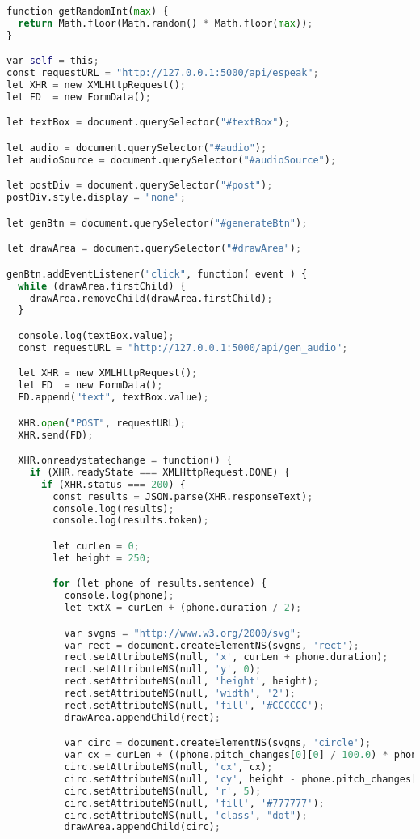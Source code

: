\begin{lstlisting}[caption=Script para editor gráfico, label=editorjs, language=Python]
function getRandomInt(max) {
  return Math.floor(Math.random() * Math.floor(max));
}

var self = this;
const requestURL = "http://127.0.0.1:5000/api/espeak";
let XHR = new XMLHttpRequest();
let FD  = new FormData();

let textBox = document.querySelector("#textBox");

let audio = document.querySelector("#audio");
let audioSource = document.querySelector("#audioSource");

let postDiv = document.querySelector("#post");
postDiv.style.display = "none";

let genBtn = document.querySelector("#generateBtn");

let drawArea = document.querySelector("#drawArea");

genBtn.addEventListener("click", function( event ) {
  while (drawArea.firstChild) {
    drawArea.removeChild(drawArea.firstChild);
  }

  console.log(textBox.value);
  const requestURL = "http://127.0.0.1:5000/api/gen_audio";

  let XHR = new XMLHttpRequest();
  let FD  = new FormData();
  FD.append("text", textBox.value);

  XHR.open("POST", requestURL);
  XHR.send(FD);

  XHR.onreadystatechange = function() {
    if (XHR.readyState === XMLHttpRequest.DONE) {
      if (XHR.status === 200) {
        const results = JSON.parse(XHR.responseText);
        console.log(results);
        console.log(results.token);

        let curLen = 0;
        let height = 250;

        for (let phone of results.sentence) {
          console.log(phone);
          let txtX = curLen + (phone.duration / 2);

          var svgns = "http://www.w3.org/2000/svg";
          var rect = document.createElementNS(svgns, 'rect');
          rect.setAttributeNS(null, 'x', curLen + phone.duration);
          rect.setAttributeNS(null, 'y', 0);
          rect.setAttributeNS(null, 'height', height);
          rect.setAttributeNS(null, 'width', '2');
          rect.setAttributeNS(null, 'fill', '#CCCCCC');
          drawArea.appendChild(rect);

          var circ = document.createElementNS(svgns, 'circle');
          var cx = curLen + ((phone.pitch_changes[0][0] / 100.0) * phone.duration);
          circ.setAttributeNS(null, 'cx', cx);
          circ.setAttributeNS(null, 'cy', height - phone.pitch_changes[0][1]);
          circ.setAttributeNS(null, 'r', 5);
          circ.setAttributeNS(null, 'fill', '#777777');
          circ.setAttributeNS(null, 'class', "dot");
          drawArea.appendChild(circ);


\end{lstlisting}
